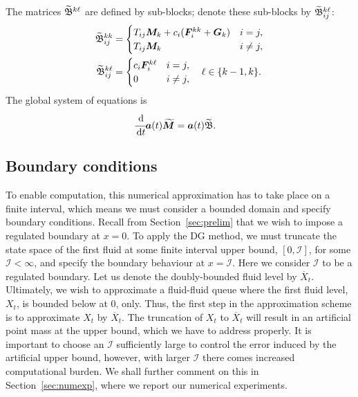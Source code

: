 The matrices \(\widetilde{\mathfrak{\boldsymbol B}}^{k\ell}\) are defined by sub-blocks; denote these sub-blocks by \(\widetilde{\mathfrak{\boldsymbol B}}^{k\ell}_{ij}\):
\begin{align*}
	\widetilde{\mathfrak{\boldsymbol B}}^{kk}_{ij} &= \begin{cases}T_{ij}\boldsymbol M_k + c_i(\boldsymbol F_i^{kk}+\boldsymbol G_k) & i=j,\\T_{ij}\boldsymbol M_k & i\neq j,\end{cases}
\\	\widetilde{\mathfrak{\boldsymbol B}}^{k\ell}_{ij} &= \begin{cases}c_i\boldsymbol F_i^{k\ell} & i=j,\\0 & i\neq j,\end{cases}\quad \ell \in \{k-1,k\}.
\end{align*}
The global system of equations is 
\begin{align}\label{eqn:DG ODE}
	&\cfrac{\, \mathrm{d}}{\, \mathrm{d} t} \boldsymbol a(t)\widetilde{\boldsymbol M} = \boldsymbol a(t){\widetilde{\mathfrak{\boldsymbol B}}}.
\end{align}

\subsection{Boundary conditions}
To enable computation, this numerical approximation has to take place on a finite interval, which means we must consider a bounded domain and specify boundary conditions. Recall from Section~\ref{sec:prelim} that we wish to impose a regulated boundary at \(x=0\). To apply the DG method, we must truncate the state space of the first fluid at some finite interval upper bound, \([0,\mathcal I]\), for some \(\mathcal I<\infty\), and specify the boundary behaviour at \(x=\mathcal I\). Here we consider \(\mathcal I\) to be a regulated boundary. Let us denote the doubly-bounded fluid level by \(\overline X_t\). Ultimately, we wish to approximate a fluid-fluid queue where the first fluid level, \(X_t\), is bounded below at 0, only. Thus, the first step in the approximation scheme is to approximate \(X_t\) by \(\overline X_t\). The truncation of \(X_t\) to \(\overline X_t\) will result in an artificial point mass at the upper bound, which we have to address properly. It is important to choose an \(\mathcal I\) sufficiently large to control the error induced by the artificial upper bound, however, with larger \(\mathcal I\) there comes increased computational burden. We shall further comment on this in Section~\ref{sec:numexp}, where we report our numerical experiments. 

